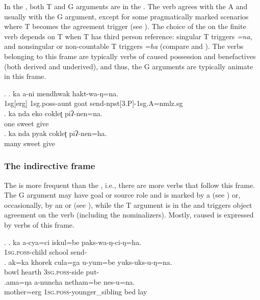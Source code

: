 
\noindent
In the , both T and G arguments are in the  . The verb agrees with the A and usually with the G argument, except for some pragmatically marked scenarios where T becomes the agreement trigger (see ). The choice of the  on the finite verb depends on T when T has third person reference: singular T triggers \emph{=na}, and nonsingular or non-countable T triggers \emph{=ha} (compare \Next[b] and \Next[c]). The verbs belonging to this frame are typically verbs of caused possession and benefactives (both derived and underived), and thus, the G arguments are typically animate in this frame.
 
\ex. \ag. ka  a-ni mendhwak hakt-wa-ŋ=na.\\
{\sc 1sg[erg]} {\sc 1sg.poss}-aunt goat send{\sc -npst[3.P]-1sg.A=nmlz.sg}\\
\bg. ka nda eko cokleʈ piʔ-nen=na.\\
		  one sweet give\\
	\bg. ka nda pyak cokleʈ piʔ-nen=ha.\\
	  many sweet give\\

\subsubsection{The indirective frame}


\noindent
The  is more frequent than the , i.e., there are more verbs that follow this frame. The G argument may have goal or source role and is marked by a  (see \Next) or, occasionally, by an  or   (see \NNext), while the T argument is in the  and triggers object agreement on the verb (including the nominalizers). Mostly, caused  is  expressed by verbs of this frame. 

\ex. \ag. ka a-cya=ci iskul=be paks-wa-ŋ-ci-ŋ=ha.\\
		 \textsc{1sg.poss}-child school send-\\
		\bg. ak=ka khorek cula=ga u-yum=be yuks-uks-u-ŋ=na.\\
	 bowl hearth \textsc{3sg.poss}-side put-\\
\bg.ama=ŋa a-nuncha netham=be nes-u=na.\\
mother{\sc =erg} \textsc{1sg.poss}-younger\_sibling  bed lay\\
	
